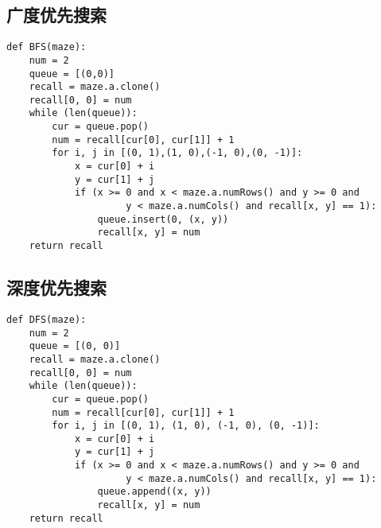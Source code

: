 \documentclass[12pt,a4paper]{article}
\begin{document}
\subsection{广度优先搜索}

\begin{adjustwidth}{2em}{0em}
\begin{verbatim}
def BFS(maze):
    num = 2
    queue = [(0,0)]
    recall = maze.a.clone()
    recall[0, 0] = num
    while (len(queue)):
        cur = queue.pop()
        num = recall[cur[0], cur[1]] + 1
        for i, j in [(0, 1),(1, 0),(-1, 0),(0, -1)]:
            x = cur[0] + i
            y = cur[1] + j
            if (x >= 0 and x < maze.a.numRows() and y >= 0 and
                     y < maze.a.numCols() and recall[x, y] == 1):
                queue.insert(0, (x, y))
                recall[x, y] = num
    return recall
\end{verbatim}
\end{adjustwidth}

\subsection{深度优先搜索}

\begin{adjustwidth}{2em}{0em}
\begin{verbatim}
def DFS(maze):
    num = 2
    queue = [(0, 0)]
    recall = maze.a.clone()
    recall[0, 0] = num
    while (len(queue)):
        cur = queue.pop()
        num = recall[cur[0], cur[1]] + 1
        for i, j in [(0, 1), (1, 0), (-1, 0), (0, -1)]:
            x = cur[0] + i
            y = cur[1] + j
            if (x >= 0 and x < maze.a.numRows() and y >= 0 and
                     y < maze.a.numCols() and recall[x, y] == 1):
                queue.append((x, y))
                recall[x, y] = num
    return recall
\end{verbatim}
\end{adjustwidth}
\end{document}
